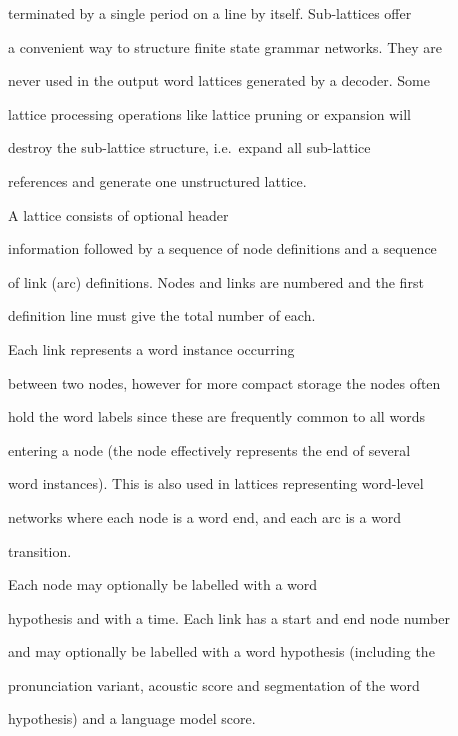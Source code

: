 terminated by a single period on a line by itself. Sub-lattices offer


a convenient way to structure finite state grammar networks. They are


never used in the output word lattices generated by a decoder. Some


lattice processing operations like lattice pruning or expansion will


destroy the sub-lattice structure, i.e.\ expand all sub-lattice


references and generate one unstructured lattice.





A lattice consists of optional header


information followed by a sequence of node definitions and a sequence


of link (arc) definitions. Nodes and links are numbered and the first


definition line must give the total number of each.





Each link represents a word instance occurring


between two nodes, however for more compact storage the nodes often


hold the word labels since these are frequently common to all words


entering a node (the node effectively represents the end of several


word instances). This is also used in lattices representing word-level


networks where each node is a word end, and each arc is a word


transition.





Each node may optionally be labelled with a word


hypothesis and with a time. Each link has a start and end node number


and may optionally be labelled with a word hypothesis (including the


pronunciation variant, acoustic score and segmentation of the word


hypothesis) and a language model score.





